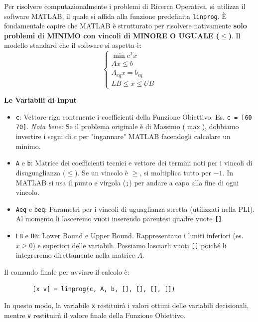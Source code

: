 \documentclass[12pt, a4paper]{article}
\begin{document}
	Per risolvere computazionalmente i problemi di Ricerca Operativa, si utilizza il software MATLAB, il quale si affida alla funzione predefinita \texttt{linprog}. È fondamentale capire che MATLAB è strutturato per risolvere nativamente \textbf{solo problemi di MINIMO con vincoli di MINORE O UGUALE ($\leq$)}. 
	Il modello standard che il software si aspetta è:
	\[
	\begin{cases}
		\min c^T x \\
		Ax \leq b \\
		A_{eq} x = b_{eq} \\
		LB \leq x \leq UB
	\end{cases}
	\]
	
	\textbf{Le Variabili di Input}
	\begin{itemize}
		\item \texttt{c}: Vettore riga contenente i coefficienti della Funzione Obiettivo. Es. \texttt{c = [60 70]}. \textit{Nota bene:} Se il problema originale è di Massimo ($\max$), dobbiamo invertire i segni di $c$ per "ingannare" MATLAB facendogli calcolare un minimo.
		\item \texttt{A} e \texttt{b}: Matrice dei coefficienti tecnici e vettore dei termini noti per i vincoli di disuguaglianza ($\leq$). Se un vincolo è $\geq$, si moltiplica tutto per $-1$. In MATLAB si usa il punto e virgola (\texttt{;}) per andare a capo alla fine di ogni vincolo. 
		\item \texttt{Aeq} e \texttt{beq}: Parametri per i vincoli di uguaglianza stretta (utilizzati nella PLI). Al momento li lasceremo vuoti inserendo parentesi quadre vuote \texttt{[]}.
		\item \texttt{LB} e \texttt{UB}: Lower Bound e Upper Bound. Rappresentano i limiti inferiori (es. $x \geq 0$) e superiori delle variabili. Possiamo lasciarli vuoti \texttt{[]} poiché li integreremo direttamente nella matrice $A$.
	\end{itemize}
	
	Il comando finale per avviare il calcolo è:
	\begin{verbatim}
		[x v] = linprog(c, A, b, [], [], [], [])
	\end{verbatim}
	In questo modo, la variabile \texttt{x} restituirà i valori ottimi delle variabili decisionali, mentre \texttt{v} restituirà il valore finale della Funzione Obiettivo.
	
	\vspace{0.6cm}
	
\end{document}
